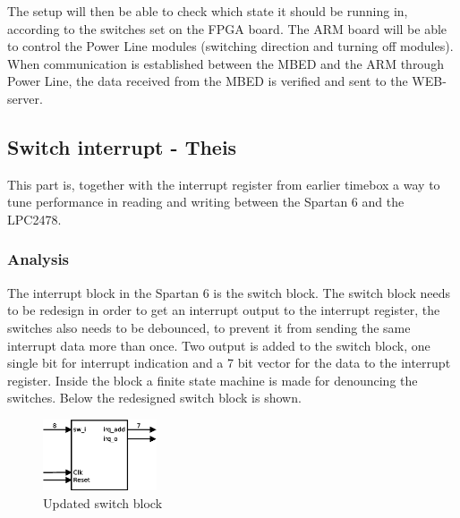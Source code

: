 The setup will then be able to check which state it should be running in, according to the switches set on the FPGA board. The ARM board will be able to control the Power Line modules (switching direction and turning off modules). When communication is established between the MBED and the ARM through Power Line, the data received from the MBED is verified and sent to the WEB-server. 

\subsection{Switch interrupt - Theis}
%
This part is, together with the interrupt register from earlier timebox a way to tune performance in reading and writing between the Spartan 6 and the LPC2478.
\subsubsection{Analysis}
%
%
The interrupt block in the Spartan 6 is the switch block. The switch block needs to be redesign in order to get an interrupt output to the interrupt register, the switches also needs to be debounced, to prevent it from sending the same interrupt data more than once. Two output is added to the switch block, one single bit for interrupt indication and a 7 bit vector for the data to the interrupt register. Inside the block a finite state machine is made for denouncing the switches. Below the redesigned switch block is shown.

\begin{figure}[H]
	\begin{centering}
		\includegraphics[width=0.3\textwidth]{images/tb6_switchblock.eps}
		\caption{Updated switch block}
	\end{centering}
\end{figure}


